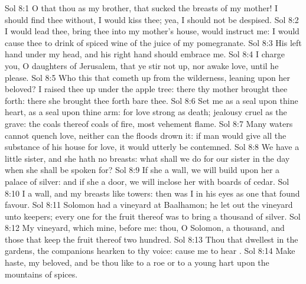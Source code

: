 \vs Sol 8:1 O that thou  as my brother, that sucked the breasts of my mother!  I should find thee without, I would kiss thee; yea, I should not be despised.
\vs Sol 8:2 I would lead thee,  bring thee into my mother's house,  would instruct me: I would cause thee to drink of spiced wine of the juice of my pomegranate.
\vs Sol 8:3 His left hand  under my head, and his right hand should embrace me.
\vs Sol 8:4 I charge you, O daughters of Jerusalem, that ye stir not up, nor awake  love, until he please.
\vs Sol 8:5 Who  this that cometh up from the wilderness, leaning upon her beloved? I raised thee up under the apple tree: there thy mother brought thee forth: there she brought thee forth  bare thee.
\vs Sol 8:6 Set me as a seal upon thine heart, as a seal upon thine arm: for love  strong as death; jealousy  cruel as the grave: the coals thereof  coals of fire,  most vehement flame.
\vs Sol 8:7 Many waters cannot quench love, neither can the floods drown it: if  man would give all the substance of his house for love, it would utterly be contemned.
\vs Sol 8:8 We have a little sister, and she hath no breasts: what shall we do for our sister in the day when she shall be spoken for?
\vs Sol 8:9 If she  a wall, we will build upon her a palace of silver: and if she  a door, we will inclose her with boards of cedar.
\vs Sol 8:10 I  a wall, and my breasts like towers: then was I in his eyes as one that found favour.
\vs Sol 8:11 Solomon had a vineyard at Baalhamon; he let out the vineyard unto keepers; every one for the fruit thereof was to bring a thousand  of silver.
\vs Sol 8:12 My vineyard, which  mine,  before me: thou, O Solomon,  a thousand, and those that keep the fruit thereof two hundred.
\vs Sol 8:13 Thou that dwellest in the gardens, the companions hearken to thy voice: cause me to hear .
\vs Sol 8:14 Make haste, my beloved, and be thou like to a roe or to a young hart upon the mountains of spices.
